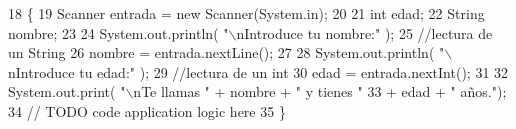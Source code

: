 \begin{DoxyCode}
18                                            \{
19         Scanner entrada = \textcolor{keyword}{new} Scanner(System.in);
20        
21         \textcolor{keywordtype}{int} edad;
22         String nombre;
23        
24         System.out.println( \textcolor{stringliteral}{"\(\backslash\)nIntroduce tu nombre:"} );
25         \textcolor{comment}{//lectura de un String}
26         nombre = entrada.nextLine();
27        
28         System.out.println( \textcolor{stringliteral}{"\(\backslash\)nIntroduce tu edad:"} );       
29         \textcolor{comment}{//lectura de un int}
30         edad = entrada.nextInt();
31        
32         System.out.print( \textcolor{stringliteral}{"\(\backslash\)nTe llamas "} + nombre + \textcolor{stringliteral}{" y tienes "}
33                                                + edad + \textcolor{stringliteral}{" años."});
34         \textcolor{comment}{// TODO code application logic here}
35     \}
\end{DoxyCode}

